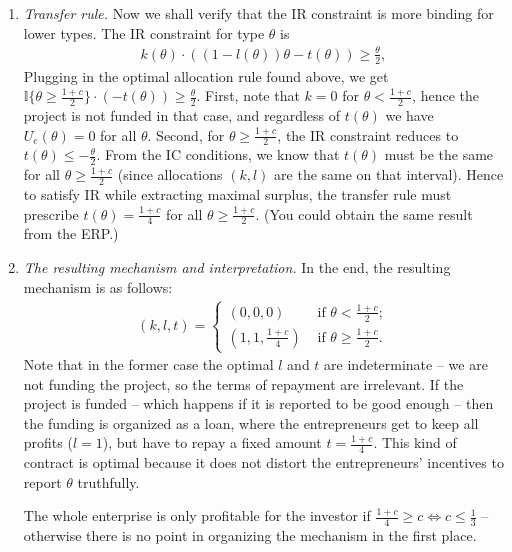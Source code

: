 \documentclass[a4paper]{article}
\begin{document}
\begin{enumerate}
		\item \emph{Transfer rule.} Now we shall verify that the IR constraint is more binding for lower types. The IR constraint for type $\theta$ is
		\begin{align*}
			k(\theta) \cdot \left( (1-l(\theta)) \theta - t(\theta) \right) \geq \frac{\theta}{2},
		\end{align*}
		Plugging in the optimal allocation rule found above, we get $\mathbb{I}\{ \theta \geq \frac{1+c}{2} \} \cdot (-t(\theta)) \geq \frac{\theta}{2}$. First, note that $k=0$ for $\theta < \frac{1+c}{2}$, hence the project is not funded in that case, and regardless of $t(\theta)$ we have $U_e(\theta)=0$ for all $\theta$. Second, for $\theta \geq \frac{1+c}{2}$, the IR constraint reduces to $t(\theta) \leq -\frac{\theta}{2}$. From the IC conditions, we know that $t(\theta)$ must be the same for all $\theta \geq \frac{1+c}{2}$ (since allocations $(k,l)$ are the same on that interval). Hence to satisfy IR while extracting maximal surplus, the transfer rule must prescribe $t(\theta) = \frac{1+c}{4}$ for all $\theta \geq \frac{1+c}{2}$. (You could obtain the same result from the ERP.)
		
		\item \emph{The resulting mechanism and interpretation.} In the end, the resulting mechanism is as follows:
		\begin{align*}
			(k,l,t) = 
			\begin{cases}
				(0,0,0) & \text{ if } \theta < \frac{1+c}{2};
				\\
				\left(1,1,\frac{1+c}{4}\right) & \text{ if } \theta \geq \frac{1+c}{2}.
			\end{cases}
		\end{align*}
		Note that in the former case the optimal $l$ and $t$ are indeterminate -- we are not funding the project, so the terms of repayment are irrelevant. If the project is funded -- which happens if it is reported to be good enough -- then the funding is organized as a loan, where the entrepreneurs get to keep all profits ($l=1$), but have to repay a fixed amount $t=\frac{1+c}{4}$. This kind of contract is optimal because it does not distort the entrepreneurs' incentives to report $\theta$ truthfully. 
		
		The whole enterprise is only profitable for the investor if $\frac{1+c}{4} \geq c \Leftrightarrow c \leq \frac{1}{3}$ -- otherwise there is no point in organizing the mechanism in the first place.
	\end{enumerate}
\end{document}
